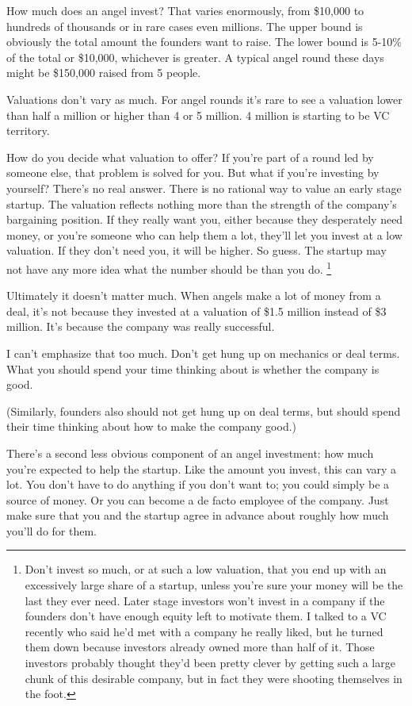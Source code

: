 \documentclass[12pt]{book}
\begin{document}
How much does an angel invest? That varies enormously, from \$10,000 to
hundreds of thousands or in rare cases even millions. The upper bound is
obviously the total amount the founders want to raise. The lower bound
is 5-10\% of the total or \$10,000, whichever is greater. A typical
angel round these days might be \$150,000 raised from 5 people.

Valuations don't vary as much. For angel rounds it's rare to see a
valuation lower than half a million or higher than 4 or 5 million. 4
million is starting to be VC territory.

How do you decide what valuation to offer? If you're part of a round led
by someone else, that problem is solved for you. But what if you're
investing by yourself? There's no real answer. There is no rational way
to value an early stage startup. The valuation reflects nothing more
than the strength of the company's bargaining position. If they really
want you, either because they desperately need money, or you're someone
who can help them a lot, they'll let you invest at a low valuation. If
they don't need you, it will be higher. So guess. The startup may not
have any more idea what the number should be than you do.
\footnote{Don't invest so much, or at such a low valuation, that you end
up with an excessively large share of a startup, unless you're sure your
money will be the last they ever need. Later stage investors won't
invest in a company if the founders don't have enough equity left to
motivate them. I talked to a VC recently who said he'd met with a
company he really liked, but he turned them down because investors
already owned more than half of it. Those investors probably thought
they'd been pretty clever by getting such a large chunk of this
desirable company, but in fact they were shooting themselves in the
foot.}

Ultimately it doesn't matter much. When angels make a lot of money from
a deal, it's not because they invested at a valuation of \$1.5 million
instead of \$3 million. It's because the company was really successful.

I can't emphasize that too much. Don't get hung up on mechanics or deal
terms. What you should spend your time thinking about is whether the
company is good.

(Similarly, founders also should not get hung up on deal terms, but
should spend their time thinking about how to make the company good.)

There's a second less obvious component of an angel investment: how much
you're expected to help the startup. Like the amount you invest, this
can vary a lot. You don't have to do anything if you don't want to; you
could simply be a source of money. Or you can become a de facto employee
of the company. Just make sure that you and the startup agree in advance
about roughly how much you'll do for them.
\end{document}
